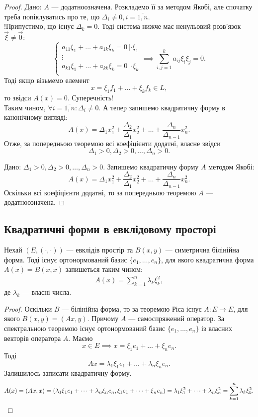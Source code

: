 \documentclass{math_library}
\begin{document}
\begin{proof}
\rightproof Дано: $A$ --- додатноозначена. Розкладемо її за методом Якобі, але спочатку треба попіклуватись про те, що $\Delta_i \neq 0, i = \overline{1,n}$.\\
!Припустимо, що існує $\Delta_k = 0$. Тоді система нижче має ненульовий розв'язок $\vec{\xi} \neq \vec{0}$:
\[
\begin{cases}
a_{11}\xi_1 + \dots + a_{1k}\xi_k = 0 \ | \cdot \xi_1 \\
\vdots \\
a_{k1}\xi_1 + \dots + a_{kk}\xi_k = 0 \ | \cdot \xi_k \\
\end{cases} \implies \displaystyle\sum_{i,j=1}^k a_{ij}\xi_i \xi_j = 0.
\]
Тоді якщо візьмемо елемент 
\[
x = \xi_1 f_1 + \dots + \xi_k f_k \in L,
\]
то звідси $A(x) = 0$. Суперечність!\\
Таким чином, $\forall i=\overline{1,n}: \Delta_i \neq 0$. А тепер запишемо квадратичну форму в канонічному вигляді:
\[
A(x) = \Delta_1 x_1^2 + \dfrac{\Delta_2}{\Delta_1} x_2^2 + \dots + \dfrac{\Delta_n}{\Delta_{n-1}} x_n^2.
\]
Отже, за попередньою теоремою всі коефіцієнти додатні, власне звідси \[
\Delta_1>0,\Delta_2>0,\dots,\Delta_n>0.
\]

\leftproof Дано: $\Delta_1>0,\Delta_2>0,\dots,\Delta_n>0$. Запишемо квадратичну форму $A$ методом Якобі:
\[
A(x) = \Delta_1 x_1^2 + \dfrac{\Delta_2}{\Delta_1} x_2^2 + \dots + \dfrac{\Delta_n}{\Delta_{n-1}} x_n^2.
\]
Оскільки всі коефіцієнти додатні, то за попередньою теоремою $A$ --- додатноозначена.
\end{proof}

\subsection{Квадратичні форми в евклідовому просторі}
\begin{theorem}
Нехай $(E,(\cdot,\cdot))$ --- евклідів простір та $B(x,y)$ --- симетрична білінійна форма. Тоді існує ортонормований базис $\{e_1,\dots,e_n\}$, для якого квадратична форма $A(x) = B(x,x)$ запишеться таким чином:
\begin{align*}
A(x) = \displaystyle\sum_{k=1}^n \lambda_k \xi_k^2,
\end{align*}
де $\lambda_k$ --- власні числа.
\end{theorem}

\begin{proof}
Оскільки $B$ --- білінійна форма, то за теоремою Ріса існує $A \colon E \to E$, для якого $B(x,y) = (Ax,y)$. Причому $A$ --- самоспряжений оператор. За спектральною теоремою існує ортонормований базис $\{e_1,\dots,e_n\}$ із власних векторів оператора $A$. Маємо 
\[
x \in E \implies x = \xi_1 e_1 + \dots + \xi_n e_n.
\] 
Тоді 
\[
Ax = \lambda_1 \xi_1 e_1 + \dots + \lambda_n \xi_n e_n.
\]
Залишилось записати квадратичну форму.
\[
A(x) = (Ax,x) = (\lambda_1 \xi_1 e_1 + \dots + \lambda_n \xi_n e_n, \xi_1 e_1 + \dots + \xi_n e_n) = \lambda_1 \xi_1^2 + \dots + \lambda_n \xi_n^2 = \displaystyle\sum_{k=1}^n \lambda_k \xi_k^2.
\qedhere
\]
\end{proof}
\end{document}
